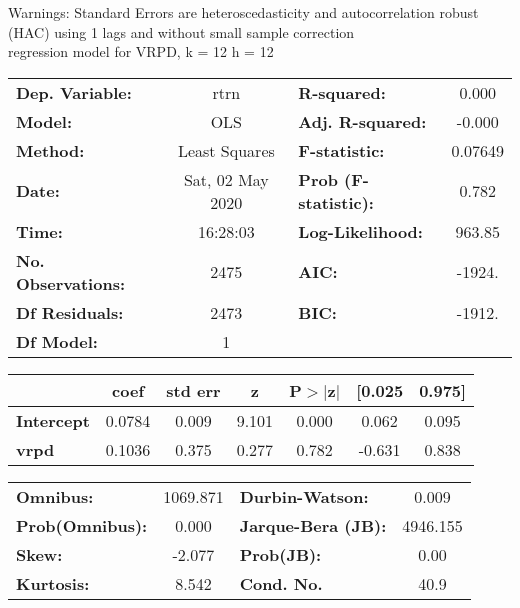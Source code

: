 Warnings: \newline
 [1] Standard Errors are heteroscedasticity and autocorrelation robust (HAC) using 1 lags and without small sample correction\\ 

regression model for VRPD, k = 12 h = 12\begin{center}
\begin{tabular}{lclc}
\toprule
\textbf{Dep. Variable:}    &       rtrn       & \textbf{  R-squared:         } &     0.000   \\
\textbf{Model:}            &       OLS        & \textbf{  Adj. R-squared:    } &    -0.000   \\
\textbf{Method:}           &  Least Squares   & \textbf{  F-statistic:       } &   0.07649   \\
\textbf{Date:}             & Sat, 02 May 2020 & \textbf{  Prob (F-statistic):} &    0.782    \\
\textbf{Time:}             &     16:28:03     & \textbf{  Log-Likelihood:    } &    963.85   \\
\textbf{No. Observations:} &        2475      & \textbf{  AIC:               } &    -1924.   \\
\textbf{Df Residuals:}     &        2473      & \textbf{  BIC:               } &    -1912.   \\
\textbf{Df Model:}         &           1      & \textbf{                     } &             \\
\bottomrule
\end{tabular}
\begin{tabular}{lcccccc}
                   & \textbf{coef} & \textbf{std err} & \textbf{z} & \textbf{P$> |$z$|$} & \textbf{[0.025} & \textbf{0.975]}  \\
\midrule
\textbf{Intercept} &       0.0784  &        0.009     &     9.101  &         0.000        &        0.062    &        0.095     \\
\textbf{vrpd}      &       0.1036  &        0.375     &     0.277  &         0.782        &       -0.631    &        0.838     \\
\bottomrule
\end{tabular}
\begin{tabular}{lclc}
\textbf{Omnibus:}       & 1069.871 & \textbf{  Durbin-Watson:     } &    0.009  \\
\textbf{Prob(Omnibus):} &   0.000  & \textbf{  Jarque-Bera (JB):  } & 4946.155  \\
\textbf{Skew:}          &  -2.077  & \textbf{  Prob(JB):          } &     0.00  \\
\textbf{Kurtosis:}      &   8.542  & \textbf{  Cond. No.          } &     40.9  \\
\bottomrule
\end{tabular}
\end{center}

